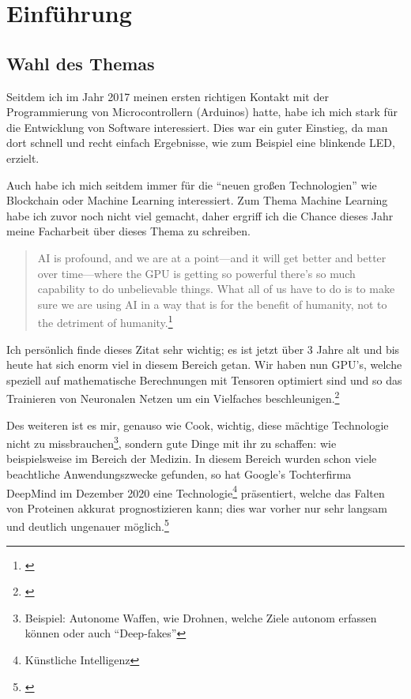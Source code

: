 \section{Einführung}

\subsection{Wahl des Themas}

Seitdem ich im Jahr 2017 meinen ersten richtigen Kontakt mit der Programmierung von Microcontrollern (Arduinos) hatte, habe ich mich stark für die Entwicklung von Software interessiert. Dies war ein guter Einstieg, da man dort schnell und recht einfach Ergebnisse, wie zum Beispiel eine blinkende LED, erzielt.

Auch habe ich mich seitdem immer für die "`neuen großen Technologien"' wie Blockchain oder Machine Learning interessiert. Zum Thema Machine Learning habe ich zuvor noch nicht viel gemacht, daher ergriff ich die Chance dieses Jahr meine Facharbeit über dieses Thema zu schreiben.


\begin{quotation}
    AI is profound, and we are at a point—and it will get better and better over time—where the GPU is getting so powerful there’s so much capability to do unbelievable things. What all of us have to do is to make sure we are using AI in a way that is for the benefit of humanity, not to the detriment of humanity.\footnote{\cite[Tim Cook (CEO von Apple) In einem Interview mit MIT Technology Review]{timcookquote}}
\end{quotation}

Ich persönlich finde dieses Zitat sehr wichtig; es ist jetzt über 3 Jahre alt und bis heute hat sich enorm viel in diesem Bereich getan. Wir haben nun GPU's, welche speziell auf mathematische Berechnungen mit Tensoren optimiert sind und so das Trainieren von Neuronalen Netzen um ein Vielfaches beschleunigen.\footnote{\cite[NVIDIA Grafikprozessoren mit integrierten Tensor Kernen]{nvidiatensorcores}}

Des weiteren ist es mir, genauso wie Cook, wichtig, diese mächtige Technologie nicht zu missbrauchen\footnote{Beispiel: Autonome Waffen, wie Drohnen, welche Ziele autonom erfassen können oder auch "`Deep-fakes"'}, sondern gute Dinge mit ihr zu schaffen: wie beispielsweise im Bereich der Medizin. In diesem Bereich wurden schon viele beachtliche Anwendungszwecke gefunden, so hat Google's Tochterfirma DeepMind im Dezember 2020 eine Technologie\footnote{Künstliche Intelligenz} präsentiert, welche das Falten von Proteinen akkurat prognostizieren kann; dies war vorher nur sehr langsam und deutlich ungenauer möglich.\footnote{\cite{deepmindprotein}}

